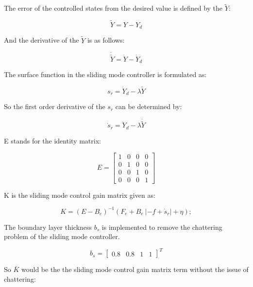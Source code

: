 The error of the controlled states from the desired value is defined by the $\tilde{Y}$:

\begin{equation}
	\tilde{Y}=Y-Y_d
\end{equation}

And the derivative of the $\tilde{Y}$ is as follows:

\begin{equation}
	\dot{\tilde{Y}}=\dot{Y}-\dot{Y}_d
\end{equation}

The surface function in the sliding mode controller is formulated as:

\begin{equation}
	s_r=\dot{Y}_d-\lambda\tilde{Y}
\end{equation}

So the first order derivative of the $s_r$ can be determined by:

\begin{equation}
	\dot{s}_r=\ddot{Y}_d-\lambda \dot{\tilde{Y}}
\end{equation}

E stands for the identity matrix:

\begin{equation}
	E=
	\begin{bmatrix}
		1& 0 & 0 & 0\\
		0 &1 & 0 & 0\\
		0 & 0 & 1 & 0\\
		0 & 0 & 0 & 1
	\end{bmatrix}
\end{equation}

K is the sliding mode control gain matrix given as:

\begin{equation}
	K = (E- B_e)^{-1} (F_e + B_e \  |-f + \dot{s}_r| + \eta);
\end{equation}

The boundary layer thickness $b_s$ is implemented to remove the chattering problem of the sliding mode controller.

\begin{equation}
	b_s=\begin{bmatrix}
		0.8&
		0.8&
		1&
		1
	\end{bmatrix}^T
\end{equation}

So $\bar{K}$ would be the the sliding mode control gain matrix term without the issue of chattering:

